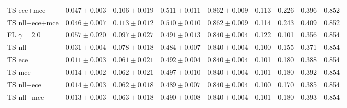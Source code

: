 \begin{table}[h!]
{\begin{tabular}{l|cccc|m{0.8cm}m{0.8cm}m{0.8cm}m{0.8cm}|}
			TS ece+mce & \multicolumn{1}{c|}{$0.047 \pm 0.003$} & \multicolumn{1}{c|}{$0.106 \pm 0.019$} & \multicolumn{1}{c|}{$0.511 \pm 0.011$} & \multicolumn{1}{c|}{$0.862 \pm 0.009$} & \multicolumn{1}{c|}{0.113} & \multicolumn{1}{c|}{0.226} & \multicolumn{1}{c|}{0.396} & \multicolumn{1}{c|}{0.852} \\
			TS nll+ece+mce & \multicolumn{1}{c|}{$0.046 \pm 0.007$} & \multicolumn{1}{c|}{$0.113 \pm 0.012$} & \multicolumn{1}{c|}{$0.510 \pm 0.010$} & \multicolumn{1}{c|}{$0.862 \pm 0.009$} & \multicolumn{1}{c|}{0.114} & \multicolumn{1}{c|}{0.243} & \multicolumn{1}{c|}{0.409} & \multicolumn{1}{c|}{0.852} \\ \hline \hline
			FL $\gamma=2.0$ & \multicolumn{1}{c|}{$0.057 \pm 0.020$}& \multicolumn{1}{c|}{$0.097 \pm 0.027$}& \multicolumn{1}{c|}{$0.491 \pm 0.013$}& \multicolumn{1}{c|}{$0.840 \pm 0.004$}& \multicolumn{1}{c|}{0.122} & \multicolumn{1}{c|}{0.101} & \multicolumn{1}{c|}{0.356} & \multicolumn{1}{c|}{0.854} \\
			TS nll & \multicolumn{1}{c|}{$0.031 \pm 0.004$}& \multicolumn{1}{c|}{$0.078 \pm 0.018$}& \multicolumn{1}{c|}{$0.484 \pm 0.007$}& \multicolumn{1}{c|}{$0.840 \pm 0.004$}& \multicolumn{1}{c|}{0.100} & \multicolumn{1}{c|}{0.155} & \multicolumn{1}{c|}{0.371} & \multicolumn{1}{c|}{0.854} \\
			TS ece & \multicolumn{1}{c|}{$0.011 \pm 0.003$}& \multicolumn{1}{c|}{$0.061 \pm 0.021$}& \multicolumn{1}{c|}{$0.492 \pm 0.004$}& \multicolumn{1}{c|}{$0.840 \pm 0.004$}& \multicolumn{1}{c|}{0.101} & \multicolumn{1}{c|}{0.180} & \multicolumn{1}{c|}{0.388} & \multicolumn{1}{c|}{0.854} \\
			TS mce & \multicolumn{1}{c|}{$0.014 \pm 0.002$}& \multicolumn{1}{c|}{$0.062 \pm 0.021$}& \multicolumn{1}{c|}{$0.497 \pm 0.010$}& \multicolumn{1}{c|}{$0.840 \pm 0.004$}& \multicolumn{1}{c|}{0.101} & \multicolumn{1}{c|}{0.180} & \multicolumn{1}{c|}{0.392} & \multicolumn{1}{c|}{0.854} \\
			TS nll+ece & \multicolumn{1}{c|}{$0.014 \pm 0.003$}& \multicolumn{1}{c|}{$0.062 \pm 0.018$}& \multicolumn{1}{c|}{$0.489 \pm 0.007$}& \multicolumn{1}{c|}{$0.840 \pm 0.004$}& \multicolumn{1}{c|}{0.100} & \multicolumn{1}{c|}{0.170} & \multicolumn{1}{c|}{0.385} & \multicolumn{1}{c|}{0.854} \\
			TS nll+mce & \multicolumn{1}{c|}{$0.013 \pm 0.003$}& \multicolumn{1}{c|}{$0.063 \pm 0.018$}& \multicolumn{1}{c|}{$0.490 \pm 0.008$}& \multicolumn{1}{c|}{$0.840 \pm 0.004$}& \multicolumn{1}{c|}{0.101} & \multicolumn{1}{c|}{0.180} & \multicolumn{1}{c|}{0.393} & \multicolumn{1}{c|}{0.854} \\

\end{tabular}}
\end{table}
